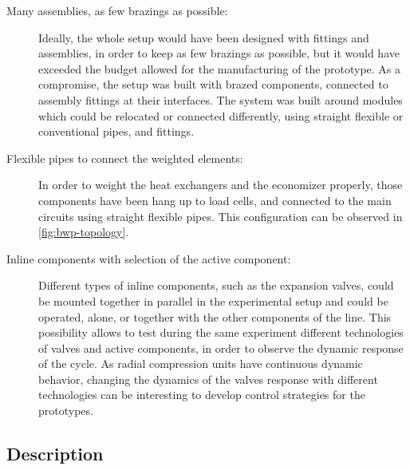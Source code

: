 \begin{description}
\item[Many assemblies, as few brazings as possible:] Ideally, the
  whole setup would have been designed with fittings and assemblies,
  in order to keep as few brazings as possible, but it would have
  exceeded the budget allowed for the manufacturing of the
  prototype. As a compromise, the setup was built with brazed
  components, connected to assembly fittings at their interfaces. The
  system was built around modules which could be relocated or
  connected differently, using straight flexible or conventional
  pipes, and fittings.
\item[Flexible pipes to connect the weighted elements:] In order to
  weight the heat exchangers and the economizer properly, those
  components have been hang up to load cells, and connected to the
  main circuits using straight flexible pipes. This configuration can
  be observed in \cref{fig:bwp-topology}.
\item[Inline components with selection of the active component:]
  Different types of inline components, such as the expansion valves,
  could be mounted together in parallel in the experimental setup and
  could be operated, alone, or together with the other components of
  the line. This possibility allows to test during the same experiment
  different technologies of valves and active components, in order to
  observe the dynamic response of the cycle. As radial compression units have
  continuous dynamic behavior, changing the dynamics of the valves
  response with different technologies can be interesting to develop control
  strategies for the prototypes.
\end{description}

\subsection{Description}
\label{sec:bwp-description}

